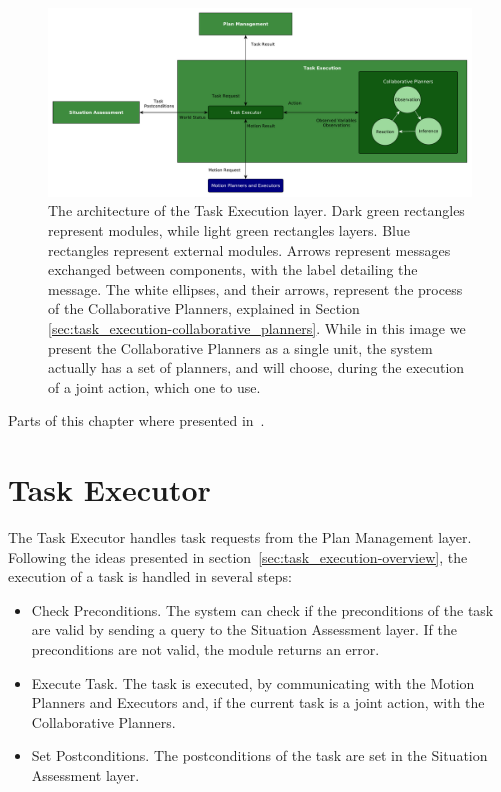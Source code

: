 \begin{figure}[h!]
	\centering
	\includegraphics[clip,scale=0.38]{img/coworker/task_execution/architecture.pdf}
	\caption[The architecture of the Task Execution layer]{The architecture of the Task Execution  layer. Dark green rectangles represent modules, while light green rectangles layers. Blue rectangles represent external modules. Arrows represent messages exchanged between components, with the label detailing the message. The white ellipses, and their arrows, represent the process of the Collaborative Planners, explained in Section \ref{sec:task_execution-collaborative_planners}. While in this image we present the Collaborative Planners as a single unit, the system actually has a set of planners, and will choose, during the execution of a joint action, which one to use.}
	\label{fig:task_execution:architecture}
\end{figure}


Parts of this chapter where presented in~\cite{fioreiser2014}.

\section{Task Executor}
\label{sec:task_execution-action_executor}
The Task Executor handles task requests from the Plan Management layer. Following the ideas presented in section~\ref{sec:task_execution-overview}, the execution of a task is handled in several steps:
\begin{itemize}
\item Check Preconditions. The system can check if the preconditions of the task are valid by sending a query to the Situation Assessment layer. If the preconditions are not valid, the module returns an error.
\item Execute Task. The task is executed, by communicating with the Motion Planners and Executors and, if the current task is a joint action, with the Collaborative Planners.
\item Set Postconditions. The postconditions of the task are set in the Situation Assessment layer.
\end{itemize}

